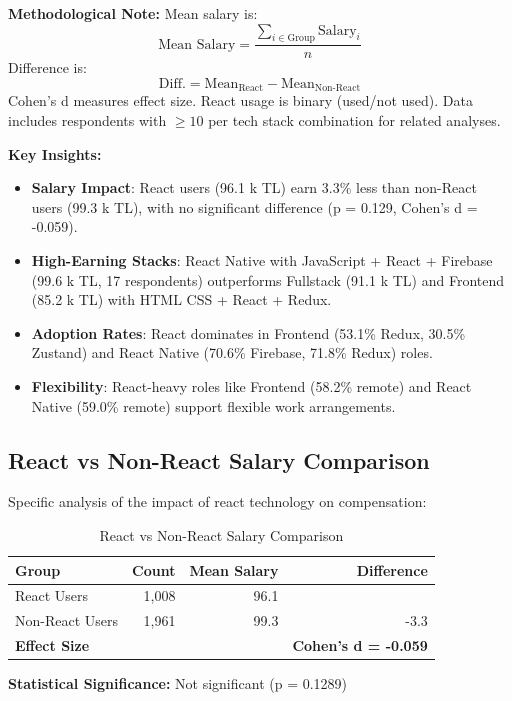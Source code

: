 \documentclass[12pt,a4paper]{article}
\begin{document}
\textbf{Methodological Note:}
Mean salary is:
\[
	\text{Mean Salary} = \frac{\sum_{i \in \text{Group}} \text{Salary}_i}{n}
\]
Difference is:
\[
	\text{Diff.} = \text{Mean}_{\text{React}} - \text{Mean}_{\text{Non-React}}
\]
Cohen’s d measures effect size. React usage is binary (used/not used). Data includes respondents with \(\geq 10\) per tech stack combination for related analyses.

\textbf{Key Insights:}
\begin{itemize}
	\item \textbf{Salary Impact}: React users (96.1 k TL) earn 3.3\% less than non-React users (99.3 k TL), with no significant difference (p = 0.129, Cohen’s d = -0.059).
	\item \textbf{High-Earning Stacks}: React Native with JavaScript + React + Firebase (99.6 k TL, 17 respondents) outperforms Fullstack (91.1 k TL) and Frontend (85.2 k TL) with HTML CSS + React + Redux.
	\item \textbf{Adoption Rates}: React dominates in Frontend (53.1\% Redux, 30.5\% Zustand) and React Native (70.6\% Firebase, 71.8\% Redux) roles.
	\item \textbf{Flexibility}: React-heavy roles like Frontend (58.2\% remote) and React Native (59.0\% remote) support flexible work arrangements.
\end{itemize}

\subsection{React vs Non-React Salary Comparison}
Specific analysis of the impact of react technology on compensation:

\begin{table}[H]
    \centering
    \begin{tabular}{lrrr}
    \toprule
    \textbf{Group} & \textbf{Count} & \textbf{Mean Salary} & \textbf{Difference} \\
    \midrule
    React Users & 1,008 & 96.1 & \\
    Non-React Users & 1,961 & 99.3 & -3.3 \\
    \midrule
    \textbf{Effect Size} & & & \textbf{Cohen's d = -0.059} \\
    \bottomrule
    \end{tabular}
    \caption{React vs Non-React Salary Comparison}
\end{table}

\textbf{Statistical Significance:} Not significant (p = 0.1289)
\end{document}
